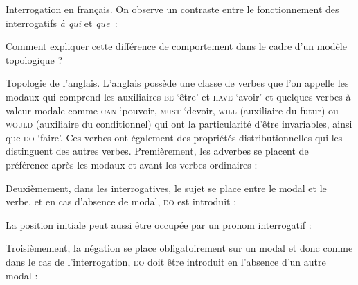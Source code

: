 {     Interrogation en français. On observe un contraste entre le fonctionnement des interrogatifs \textit{à qui} et \textit{que~}:
    
    \ea
    \z
    \z
    Comment expliquer cette différence de comportement dans le cadre d’un modèle topologique ?

     Topologie de l’anglais. L’anglais possède une classe de verbes que l’on appelle les modaux qui comprend les auxiliaires \textsc{be} ‘être’ et \textsc{have} ‘avoir’ et quelques verbes à valeur modale comme \textsc{can} ‘pouvoir, \textsc{must} ‘devoir, \textsc{will} (auxiliaire du futur) ou \textsc{would} (auxiliaire du conditionnel) qui ont la particularité d’être invariables, ainsi que \textsc{do} ‘faire’. Ces verbes ont également des propriétés distributionnelles qui les distinguent des autres verbes. Premièrement, les adverbes se placent de préférence après les modaux et avant les verbes ordinaires :
    
    \ea
    \z
    \z

    Deuxièmement, dans les interrogatives, le sujet se place entre le modal et le verbe, et en cas d’absence de modal, \textsc{do} est introduit :
    
    \ea
    \z
    \z
    La position initiale peut aussi être occupée par un pronom interrogatif :
    
    \ea
    \z
    \z
    
    Troisièmement, la négation se place obligatoirement sur un modal et donc comme dans le cas de l’interrogation, \textsc{do} doit être introduit en l’absence d’un autre modal :
    
    \ea
    \z
    \z

}
